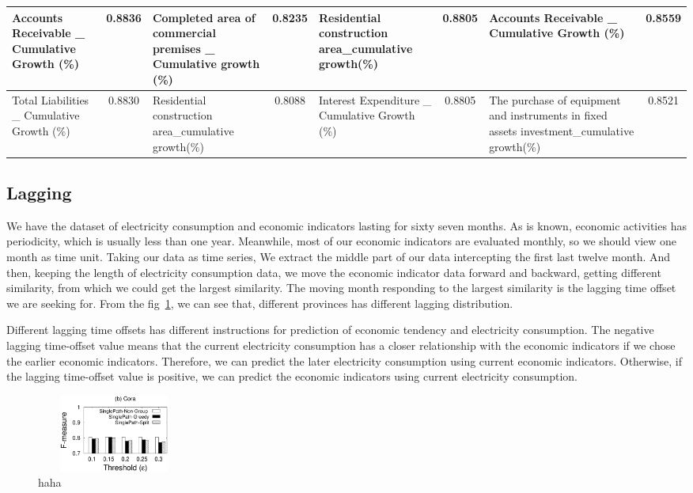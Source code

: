 \begin{table}
\begin{tabular}{|p{3cm}|c|p{3cm}|c|p{3cm}|c|p{3cm}|c|}
	Accounts Receivable \_ Cumulative Growth (\%)& 0.8836& Completed area of commercial premises \_ Cumulative growth (\%) & 0.8235&Residential construction area\_cumulative growth(\%) & 0.8805 &Accounts Receivable \_ Cumulative Growth (\%)& 0.8559\\ \hline
	Total Liabilities \_ Cumulative Growth (\%)& 0.8830 & Residential construction area\_cumulative growth(\%)&0.8088 & Interest Expenditure \_ Cumulative Growth (\%)&0.8805 & The purchase of equipment and instruments in fixed assets investment\_cumulative growth(\%) & 0.8521\\ \hline
\end{tabular}
\end{table}

\subsection{Lagging}
We have the dataset of electricity consumption and economic indicators lasting for sixty seven months. As is known, economic activities has 
periodicity, which is usually less than one year. Meanwhile, most of our economic indicators are evaluated monthly, so we should view one month as time unit. Taking our data as time series, We extract the middle part of our data intercepting the first last twelve month. And then, keeping the length of electricity consumption data, we move the economic indicator data forward and backward, getting different similarity, from which we could get the largest similarity. The moving month responding to the largest similarity is the lagging time offset we are seeking for. From the fig~\ref{fig:lagdis}, we can see that, different provinces has different lagging distribution.
 
Different lagging time offsets has different instructions for prediction of economic tendency and electricity consumption. The negative lagging time-offset value means that the current electricity consumption has a closer relationship with the economic indicators if we chose the earlier economic indicators. Therefore, we can predict the later electricity consumption using current economic indicators. Otherwise, if the lagging time-offset value is positive, we can predict the economic indicators using current electricity consumption.   
\begin{figure}
	\centering
	\includegraphics[height=1in, width=2in]{lagging_distribution}
	\caption{haha}
	\label{fig:lagdis}
\end{figure}
